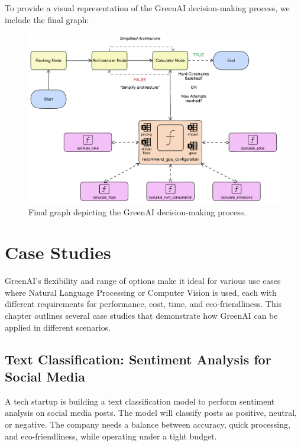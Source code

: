 \documentclass{report}
\begin{document}
To provide a visual representation of the GreenAI decision-making process, we include the final graph:

\begin{figure}[h!]
    \centering
    \includegraphics[width=\textwidth]{2.png}
    \caption{Final graph depicting the GreenAI decision-making process.}
    \label{fig:greenai_graph}
\end{figure}


\chapter{Case Studies}

GreenAI’s flexibility and range of options make it ideal for various use cases where Natural Language Processing or Computer Vision is used, each with different requirements for performance, cost, time, and eco-friendliness. This chapter outlines several case studies that demonstrate how GreenAI can be applied in different scenarios.


\section{Text Classification: Sentiment Analysis for Social Media}

A tech startup is building a text classification model to perform sentiment analysis on social media posts. The model will classify posts as positive, neutral, or negative. The company needs a balance between accuracy, quick processing, and eco-friendliness, while operating under a tight budget.
\end{document}
